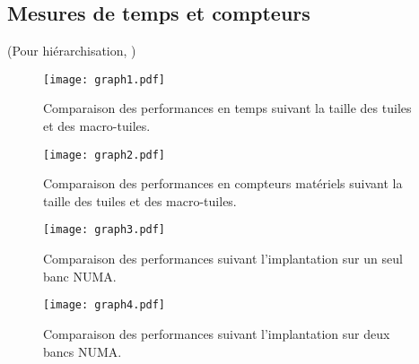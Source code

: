 \subsection{Mesures de temps et compteurs}

(Pour hiérarchisation, \cite{Ths3,Ths4})

\begin{figure}[!h]
  \caption{Comparaison des performances en temps suivant la taille des tuiles et des macro-tuiles.}
  \label{graph:comp_tuile_time}
  \texttt{[image: graph1.pdf]}
\end{figure}

\begin{figure}[!h]
  \caption{Comparaison des performances en compteurs matériels suivant la taille des tuiles et des macro-tuiles.}
  \label{graph:comp_tuile_cmiss}
  \texttt{[image: graph2.pdf]}
\end{figure}

\begin{figure}[!h]
  \caption{Comparaison des performances suivant l'implantation sur un seul banc NUMA.}
  \label{graph:comp_temps_mistral10core}
  \texttt{[image: graph3.pdf]}
\end{figure}

\begin{figure}[!h]
  \caption{Comparaison des performances suivant l'implantation sur deux bancs NUMA.}
  \label{graph:comp_temps_mistral20core}
  \texttt{[image: graph4.pdf]}
\end{figure}

